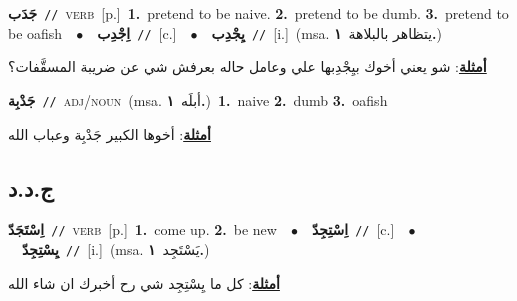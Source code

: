 \documentclass[10pt,a4paper,twoside]{article} %
\begin{document}
\begin{multicols}{2}
{\setlength\topsep{0pt}\textbf{\foreignlanguage{arabic}{جَدَب}}\ {\color{gray}\texttt{//}\color{black}}\ \textsc{verb}\ [p.]\ \textbf{1.}~pretend to be naive.  \textbf{2.}~pretend to be dumb.  \textbf{3.}~pretend to be oafish\ \ $\bullet$\ \ \setlength\topsep{0pt}\textbf{\foreignlanguage{arabic}{اِجْدِب}}\ {\color{gray}\texttt{//}\color{black}}\ [c.]\ \ $\bullet$\ \ \setlength\topsep{0pt}\textbf{\foreignlanguage{arabic}{يِجْدِب}}\ {\color{gray}\texttt{//}\color{black}}\ [i.]\ \color{gray}(msa. \foreignlanguage{arabic}{يتظاهر بالبلاهة}~\foreignlanguage{arabic}{\textbf{١.}})\color{black}\  \begin{flushright}\color{gray}\foreignlanguage{arabic}{\textbf{\underline{\foreignlanguage{arabic}{أمثلة}}}: شو يعني أخوك بيِجْدِبها علي وعامل حاله بعرفش شي عن ضريبة المسقَّفات؟}\end{flushright}\color{black}} \vspace{2mm}

{\setlength\topsep{0pt}\textbf{\foreignlanguage{arabic}{جَدْبِة}}\ {\color{gray}\texttt{//}\color{black}}\ \textsc{adj/noun}\ \color{gray}(msa. \foreignlanguage{arabic}{أبلَه}~\foreignlanguage{arabic}{\textbf{١.}})\color{black}\ \textbf{1.}~naive  \textbf{2.}~dumb  \textbf{3.}~oafish\  \begin{flushright}\color{gray}\foreignlanguage{arabic}{\textbf{\underline{\foreignlanguage{arabic}{أمثلة}}}: أخوها الكبير جَدْبِة وعباب الله}\end{flushright}\color{black}} \vspace{2mm}

\vspace{-3mm}
\subsection*{\color{blue}\foreignlanguage{arabic}{ج.د.د}\color{blue}{}} 

{\setlength\topsep{0pt}\textbf{\foreignlanguage{arabic}{اِسْتَجَدّ}}\ {\color{gray}\texttt{//}\color{black}}\ \textsc{verb}\ [p.]\ \textbf{1.}~come up.  \textbf{2.}~be new\ \ $\bullet$\ \ \setlength\topsep{0pt}\textbf{\foreignlanguage{arabic}{اِسْتِجِدّ}}\ {\color{gray}\texttt{//}\color{black}}\ [c.]\ \ $\bullet$\ \ \setlength\topsep{0pt}\textbf{\foreignlanguage{arabic}{يِسْتِجِدّ}}\ {\color{gray}\texttt{//}\color{black}}\ [i.]\ \color{gray}(msa. \foreignlanguage{arabic}{يَسْتَجِد}~\foreignlanguage{arabic}{\textbf{١.}})\color{black}\  \begin{flushright}\color{gray}\foreignlanguage{arabic}{\textbf{\underline{\foreignlanguage{arabic}{أمثلة}}}: كل ما يِسْتِجِد شي رح أخبرك ان شاء الله}\end{flushright}\color{black}} \vspace{2mm}


\end{multicols}
\end{document}
